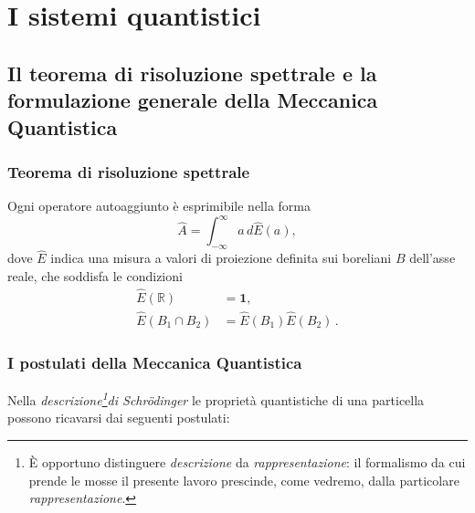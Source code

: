 \chapter{I sistemi quantistici} \label{ch:mq}

\section{Il teorema di risoluzione spettrale e la formulazione
generale della Meccanica Quantistica}

\subsection{Teorema di risoluzione spettrale}

Ogni operatore autoaggiunto 
\`{e} esprimibile nella forma\cite{VON_NEUMANN, CALDIROLA_SPETTRALE}
\begin{equation}
        \hat{A}=\int_{-\infty}^{\infty}a\, d\hat{E}(a),
                \label{eq:risoluz_spettrale}
\end{equation}
 dove $\hat{E}$ indica una misura a valori di proiezione definita
sui boreliani $B$ dell'asse reale, che soddisfa le condizioni
\begin{align*}
\hat{E}(\mathbb{R}) & =\mathbf{1},\\
        \hat{E}(B_{1}\cap B_{2}) & =\hat{E}(B_{1})\hat{E}(B_{2})\,.
\end{align*}

\subsection{I postulati della Meccanica Quantistica}

Nella \emph{descrizione\footnote{
  \`E opportuno distinguere \emph{descrizione} da \emph{rappresentazione}:
  il formalismo da cui prende le mosse il presente lavoro prescinde,
  come vedremo, dalla particolare \emph{rappresentazione}.
}di Schr\"odinger} le proprietà quantistiche
di una particella possono ricavarsi dai seguenti 
postulati\cite{CALDIROLA_GEN}:


